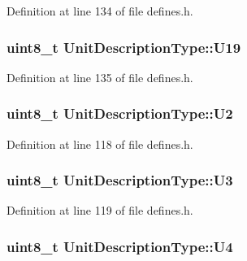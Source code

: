Definition at line 134 of file defines.\+h.

\subsubsection[{\texorpdfstring{U19}{U19}}]{\setlength{\rightskip}{0pt plus 5cm}uint8\+\_\+t Unit\+Description\+Type\+::\+U19}\hypertarget{structUnitDescriptionType_aeb14175b8f3acc759a3a3c0148a38123}{}\label{structUnitDescriptionType_aeb14175b8f3acc759a3a3c0148a38123}


Definition at line 135 of file defines.\+h.

\subsubsection[{\texorpdfstring{U2}{U2}}]{\setlength{\rightskip}{0pt plus 5cm}uint8\+\_\+t Unit\+Description\+Type\+::\+U2}\hypertarget{structUnitDescriptionType_ac6fad13d43afdf94c34b6f3a304a7005}{}\label{structUnitDescriptionType_ac6fad13d43afdf94c34b6f3a304a7005}


Definition at line 118 of file defines.\+h.

\subsubsection[{\texorpdfstring{U3}{U3}}]{\setlength{\rightskip}{0pt plus 5cm}uint8\+\_\+t Unit\+Description\+Type\+::\+U3}\hypertarget{structUnitDescriptionType_ab3e64923796c7974898273319bc0356a}{}\label{structUnitDescriptionType_ab3e64923796c7974898273319bc0356a}


Definition at line 119 of file defines.\+h.

\subsubsection[{\texorpdfstring{U4}{U4}}]{\setlength{\rightskip}{0pt plus 5cm}uint8\+\_\+t Unit\+Description\+Type\+::\+U4}\hypertarget{structUnitDescriptionType_af67d7027e3b93c0d1c6c9e316c31da52}{}\label{structUnitDescriptionType_af67d7027e3b93c0d1c6c9e316c31da52}


